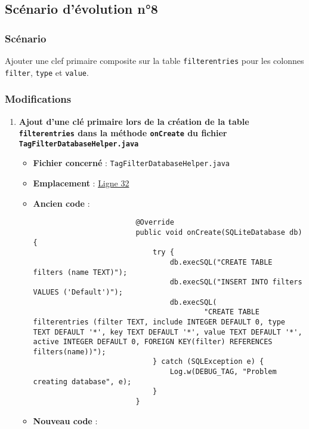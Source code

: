 \subsection{Scénario d'évolution n°8}
\subsubsection{Scénario}
Ajouter une clef primaire composite sur la table \texttt{filterentries} pour les colonnes \texttt{filter}, \texttt{type} et \texttt{value}.

\subsubsection{Modifications}
\begin{enumerate}
    \item \textbf{Ajout d'une clé primaire lors de la création de la table \texttt{filterentries} dans la méthode \texttt{onCreate} du fichier \texttt{TagFilterDatabaseHelper.java}}
          \begin{itemize}
              \item \textbf{Fichier concerné} : \texttt{TagFilterDatabaseHelper.java}
              \item \textbf{Emplacement} :
                    \href{https://github.com/MarcusWolschon/osmeditor4android/blob/master/src/main/java/de/blau/android/filter/TagFilterDatabaseHelper.java#L32 }{Ligne 32}
              \item \textbf{Ancien code} :
                    \begin{verbatim}
                        @Override
                        public void onCreate(SQLiteDatabase db) {
                            try {
                                db.execSQL("CREATE TABLE filters (name TEXT)");
                                db.execSQL("INSERT INTO filters VALUES ('Default')");
                                db.execSQL(
                                        "CREATE TABLE filterentries (filter TEXT, include INTEGER DEFAULT 0, type TEXT DEFAULT '*', key TEXT DEFAULT '*', value TEXT DEFAULT '*', active INTEGER DEFAULT 0, FOREIGN KEY(filter) REFERENCES filters(name))");
                            } catch (SQLException e) {
                                Log.w(DEBUG_TAG, "Problem creating database", e);
                            }
                        }
                    \end{verbatim}
              \item \textbf{Nouveau code} :

\end{itemize}
\end{enumerate}
